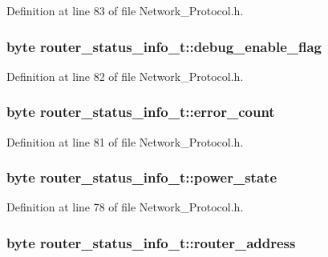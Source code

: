 Definition at line 83 of file Network\-\_\-\-Protocol.\-h.

\hypertarget{structrouter__status__info__t_aeb0a188a81590d965000b8ba2d97222d}{
\subsubsection[{debug\-\_\-enable\-\_\-flag}]{\setlength{\rightskip}{0pt plus 5cm}byte router\-\_\-status\-\_\-info\-\_\-t\-::debug\-\_\-enable\-\_\-flag}}\label{structrouter__status__info__t_aeb0a188a81590d965000b8ba2d97222d}


Definition at line 82 of file Network\-\_\-\-Protocol.\-h.

\hypertarget{structrouter__status__info__t_a63241fb3f686466e7846662512cba3da}{
\subsubsection[{error\-\_\-count}]{\setlength{\rightskip}{0pt plus 5cm}byte router\-\_\-status\-\_\-info\-\_\-t\-::error\-\_\-count}}\label{structrouter__status__info__t_a63241fb3f686466e7846662512cba3da}


Definition at line 81 of file Network\-\_\-\-Protocol.\-h.

\hypertarget{structrouter__status__info__t_a7040b5ae20fc707ba03db45c4e0b05cb}{
\subsubsection[{power\-\_\-state}]{\setlength{\rightskip}{0pt plus 5cm}byte router\-\_\-status\-\_\-info\-\_\-t\-::power\-\_\-state}}\label{structrouter__status__info__t_a7040b5ae20fc707ba03db45c4e0b05cb}


Definition at line 78 of file Network\-\_\-\-Protocol.\-h.

\hypertarget{structrouter__status__info__t_a5826bd79b5649e794ea6b3b4594b854c}{
\subsubsection[{router\-\_\-address}]{\setlength{\rightskip}{0pt plus 5cm}byte router\-\_\-status\-\_\-info\-\_\-t\-::router\-\_\-address}}\label{structrouter__status__info__t_a5826bd79b5649e794ea6b3b4594b854c}


